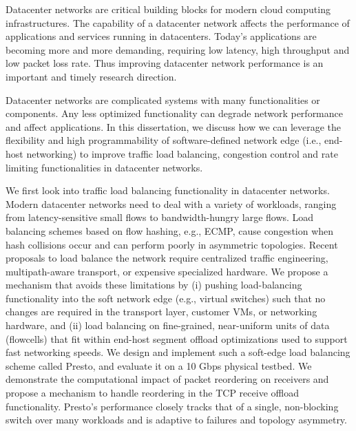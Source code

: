 
\vcinfo{}



Datacenter networks are critical building blocks for modern cloud computing 
infrastructures. The capability of a datacenter network affects the performance of 
applications and services running in datacenters. Today's applications are 
becoming more and more demanding, requiring low latency, high throughput and low packet 
loss rate. 
Thus improving datacenter network performance is an important and timely research direction.

Datacenter networks are complicated systems with many functionalities or components. 
Any less optimized functionality can degrade network performance and affect applications.
In this dissertation, we discuss how we can leverage the flexibility and high 
programmability of software-defined network edge (i.e., end-host networking) to 
improve traffic load balancing, congestion control and rate limiting functionalities in datacenter networks.

We first look into traffic load balancing functionality in datacenter networks.
Modern datacenter networks need to deal with a variety of workloads, ranging
from latency-sensitive small flows to bandwidth-hungry
large flows. Load balancing schemes based on flow hashing,
e.g., ECMP, cause congestion when hash collisions occur
and can perform poorly in asymmetric topologies. Recent
proposals to load balance the network require centralized
traffic engineering, multipath-aware transport, or expensive
specialized hardware. We propose a mechanism that
avoids these limitations by (i) pushing load-balancing functionality
into the soft network edge (e.g., virtual switches)
such that no changes are required in the transport layer, customer
VMs, or networking hardware, and (ii) load balancing
on fine-grained, near-uniform units of data (flowcells)
that fit within end-host segment offload optimizations used
to support fast networking speeds. We design and implement
such a soft-edge load balancing scheme called Presto, and
evaluate it on a 10 Gbps physical testbed. We demonstrate
the computational impact of packet reordering on receivers
and propose a mechanism to handle reordering in the TCP
receive offload functionality. Presto's performance closely
tracks that of a single, non-blocking switch over many workloads
and is adaptive to failures and topology asymmetry.

